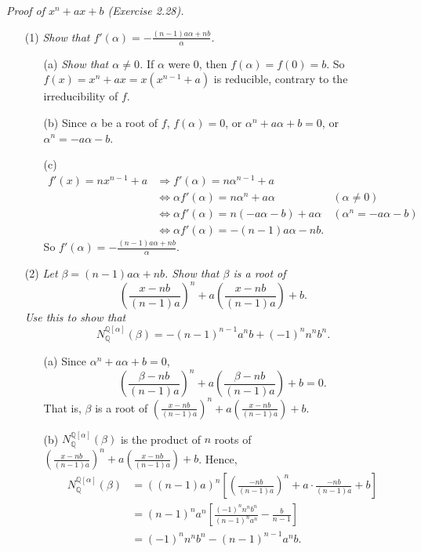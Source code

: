 \documentclass{article}
\begin{document}
\emph{Proof of $x^n + ax + b$ (Exercise 2.28).}
\begin{enumerate}
\item[(1)]
  \emph{Show that $f'(\alpha) = -\frac{(n-1)a\alpha+nb}{\alpha}$.}
  \begin{enumerate}
    \item[(a)]
      \emph{Show that $\alpha \neq 0$.}
      If $\alpha$ were $0$, then $f(\alpha) = f(0) = b$.
      So $f(x) = x^n+ax = x(x^{n-1}+a)$ is reducible, contrary to the irreducibility of $f$.

    \item[(b)]
      Since $\alpha$ be a root of $f$,
      $f(\alpha) = 0$,
      or $\alpha^n + a\alpha + b = 0$,
      or $\alpha^n = -a\alpha-b$.

    \item[(c)]
      \begin{align*}
        f'(x) = nx^{n-1} + a
        &\Longrightarrow
        f'(\alpha) = n\alpha^{n-1} + a \\
        &\Longleftrightarrow
        \alpha f'(\alpha) = n\alpha^n + a\alpha
          &(\alpha \neq 0) \\
        &\Longleftrightarrow
        \alpha f'(\alpha) = n(-a\alpha-b) + a\alpha
          &(\alpha^n = -a\alpha-b) \\
        &\Longleftrightarrow
        \alpha f'(\alpha) = -(n-1)a\alpha-nb.
        \end{align*}
      So $f'(\alpha) = -\frac{(n-1)a\alpha+nb}{\alpha}$.
  \end{enumerate}

\item[(2)]
  \emph{Let $\beta = (n-1)a\alpha+nb$.
  Show that $\beta$ is a root of
  \[
    \left( \frac{x-nb}{(n-1)a} \right)^n + a\left( \frac{x-nb}{(n-1)a} \right) + b.
  \]
  Use this to show that}
  \[
    N_{\mathbb{Q}}^{\mathbb{Q}[\alpha]}(\beta) = -(n-1)^{n-1}a^nb+(-1)^n n^n b^n.
  \]
  \begin{enumerate}
  \item[(a)]
    Since $\alpha^n + a\alpha + b = 0$,
    \[
      \left( \frac{\beta-nb}{(n-1)a} \right)^n
      + a\left( \frac{\beta-nb}{(n-1)a} \right) + b = 0.
    \]
    That is, $\beta$ is a root of
    $\left( \frac{x-nb}{(n-1)a} \right)^n + a\left( \frac{x-nb}{(n-1)a} \right) + b$.

  \item[(b)]
    $N_{\mathbb{Q}}^{\mathbb{Q}[\alpha]}(\beta)$ is the product of $n$ roots of
    $\left( \frac{x-nb}{(n-1)a} \right)^n + a\left( \frac{x-nb}{(n-1)a} \right) + b$.
    Hence,
    \begin{align*}
      N_{\mathbb{Q}}^{\mathbb{Q}[\alpha]}(\beta)
      &= ((n-1)a)^n\left[ \left(\frac{-nb}{(n-1)a}\right)^n
        + a \cdot \frac{-nb}{(n-1)a} + b \right] \\
      &= (n-1)^n a^n\left[ \frac{(-1)^n n^n b^n}{(n-1)^n a^n} - \frac{b}{n-1} \right] \\
      &= (-1)^n n^n b^n - (n-1)^{n-1} a^n b.
    \end{align*}
  \end{enumerate}


\end{enumerate}
\end{document}
